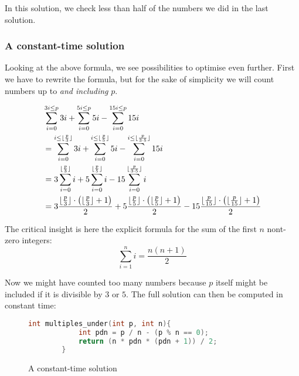 \documentclass[main.tex]{subfiles}
\begin{document}
In this solution, we check less than half of the numbers we did in the last solution.

\subsubsection{A constant-time solution}
Looking at the above formula, we see possibilities to optimise even further.
First we have to rewrite the formula, but for the sake of simplicity we will count numbers up to \textit{and including} $p$.

\begin{align*}
& \sum_{i=0}^{3i \le p}3i
+ \sum_{i=0}^{5i \le p}5i
- \sum_{i=0}^{15i \le p}15i
\\
&= \sum_{i=0}^{i \le \lfloor\frac{p}{3}\rfloor}3i
+ \sum_{i=0}^{i \le \lfloor\frac{p}{5}\rfloor}5i
- \sum_{i=0}^{i \le \lfloor\frac{p}{3\cdot 5}\rfloor}15i
\\
&= 3\sum_{i=0}^{\lfloor\frac{p}{3}\rfloor}i
+ 5\sum_{i=0}^{\lfloor\frac{p}{5}\rfloor}i
- 15\sum_{i=0}^{\lfloor\frac{p}{3\cdot 5}\rfloor}i
\\
&= 3\frac{\lfloor\frac{p}{3}\rfloor\cdot \left(\lfloor\frac{p}{3}\rfloor + 1\right)}{2}
+ 5\frac{\lfloor\frac{p}{5}\rfloor\cdot \left(\lfloor\frac{p}{5}\rfloor + 1\right)}{2}
- 15\frac{\lfloor\frac{p}{15}\rfloor\cdot \left(\lfloor\frac{p}{15}\rfloor + 1\right)}{2}
\end{align*}

The critical insight is here the explicit formula for the sum of the first $n$ nont-zero integers:
\[
\sum_{i=1}^{n}i = \frac{n(n+1)}{2}
\]

Now we might have counted too many numbers because $p$ itself might be included if it is divisible by $3$ or $5$.
The full solution can then be computed in constant time:

\begin{figure}[H]
    \centering
    \begin{lstlisting}[language=c]
        int multiples_under(int p, int n){
            int pdn = p / n - (p % n == 0);
            return (n * pdn * (pdn + 1)) / 2;
        }
    \end{lstlisting}
\caption{A constant-time solution}
\end{figure}
\end{document}
